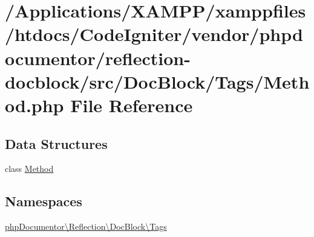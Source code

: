 \hypertarget{phpdocumentor_2reflection-docblock_2src_2_doc_block_2_tags_2_method_8php}{}\section{/\+Applications/\+X\+A\+M\+P\+P/xamppfiles/htdocs/\+Code\+Igniter/vendor/phpdocumentor/reflection-\/docblock/src/\+Doc\+Block/\+Tags/\+Method.php File Reference}
\label{phpdocumentor_2reflection-docblock_2src_2_doc_block_2_tags_2_method_8php}
\subsection*{Data Structures}
\begin{DoxyCompactItemize}
\item 
class \mbox{\hyperlink{classphp_documentor_1_1_reflection_1_1_doc_block_1_1_tags_1_1_method}{Method}}
\end{DoxyCompactItemize}
\subsection*{Namespaces}
\begin{DoxyCompactItemize}
\item 
 \mbox{\hyperlink{namespacephp_documentor_1_1_reflection_1_1_doc_block_1_1_tags}{php\+Documentor\textbackslash{}\+Reflection\textbackslash{}\+Doc\+Block\textbackslash{}\+Tags}}
\end{DoxyCompactItemize}
